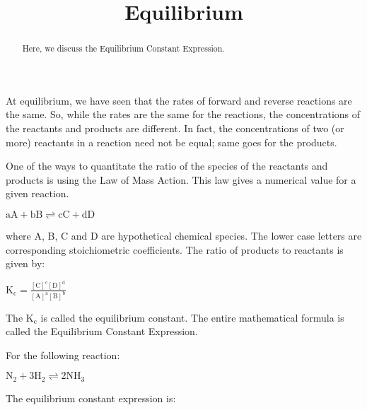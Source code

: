 \documentclass{ximera}
\title{Equilibrium}
\begin{document}
\begin{abstract}
Here, we discuss the Equilibrium Constant Expression.
\end{abstract}
\maketitle

At equilibrium, we have seen that the rates of forward and reverse reactions are the same. So, while the rates are the same for the reactions, the concentrations of the reactants and products are different. In fact, the concentrations of two (or more) reactants in a reaction need not be equal; same goes for the products.

One of the ways to quantitate the ratio of the species of the reactants and products is using the Law of Mass Action. This law gives a numerical value for a given reaction. 


%
%
    $\mathrm{aA+ bB  \rightleftharpoons cC + dD}$
                                                                         

where A, B, C and D are hypothetical chemical species. The lower case letters are corresponding stoichiometric coefficients. The ratio of products to reactants is given by:

$\mathrm{K_c=\frac{[C]^c[D]^d}{[A]^a[B]^b}}$

The $\mathrm{K_c}$ is called the equilibrium constant. The entire mathematical formula is called the Equilibrium Constant Expression. 

\begin{question}
For the following reaction:

$\mathrm{N_2+ 3H_2  \rightleftharpoons 2NH_3}$


The equilibrium constant expression is:

 \begin{multipleChoice}
\end{multipleChoice}
\end{question}
\end{document}
